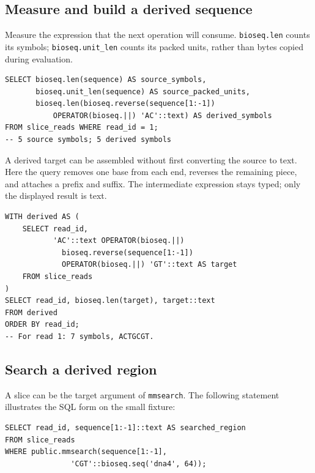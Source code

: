 \subsection{Measure and build a derived sequence}

Measure the expression that the next operation will consume.
\texttt{bioseq.len} counts its symbols; \texttt{bioseq.unit\_len} counts
its packed units, rather than bytes copied during evaluation.

\par\noindent\begin{minipage}{\linewidth}
\begin{lstlisting}[style=bioseq-appendix-sql]
SELECT bioseq.len(sequence) AS source_symbols,
       bioseq.unit_len(sequence) AS source_packed_units,
       bioseq.len(bioseq.reverse(sequence[1:-1])
           OPERATOR(bioseq.||) 'AC'::text) AS derived_symbols
FROM slice_reads WHERE read_id = 1;
-- 5 source symbols; 5 derived symbols
\end{lstlisting}
\end{minipage}

A derived target can be assembled without first converting the source to
text. Here the query removes one base from each end, reverses the remaining
piece, and attaches a prefix and suffix. The intermediate expression stays
typed; only the displayed result is text.

\par\noindent\begin{minipage}{\linewidth}
\begin{lstlisting}[style=bioseq-appendix-sql]
WITH derived AS (
    SELECT read_id,
           'AC'::text OPERATOR(bioseq.||)
             bioseq.reverse(sequence[1:-1])
             OPERATOR(bioseq.||) 'GT'::text AS target
    FROM slice_reads
)
SELECT read_id, bioseq.len(target), target::text
FROM derived
ORDER BY read_id;
-- For read 1: 7 symbols, ACTGCGT.
\end{lstlisting}
\end{minipage}

\subsection{Search a derived region}

A slice can be the target argument of \texttt{mmsearch}. The following
statement illustrates the SQL form on the small fixture:

\par\noindent\begin{minipage}{\linewidth}
\begin{lstlisting}[style=bioseq-appendix-sql]
SELECT read_id, sequence[1:-1]::text AS searched_region
FROM slice_reads
WHERE public.mmsearch(sequence[1:-1],
               'CGT'::bioseq.seq('dna4', 64));
\end{lstlisting}
\end{minipage}

